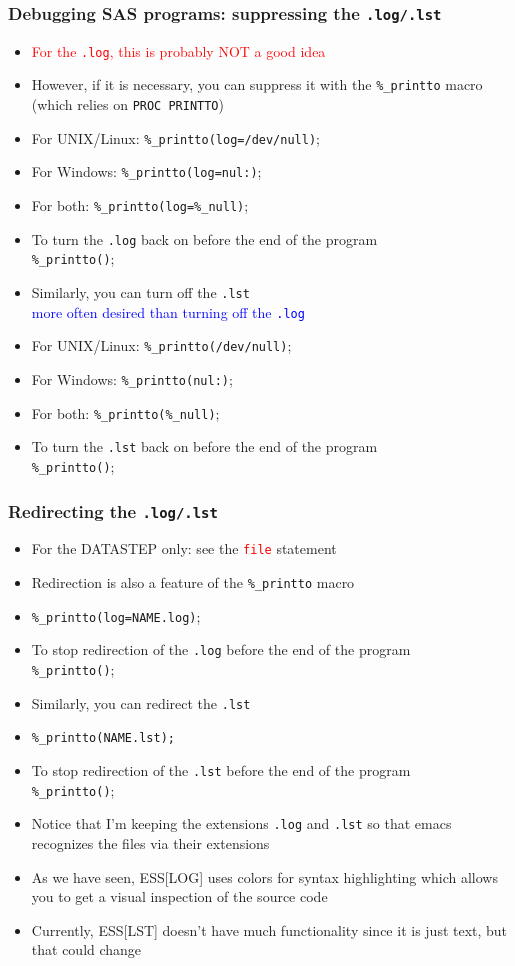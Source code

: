 \documentclass[11pt,pdftex,dvipsnames,usenames,helvetica]{beamer}
\begin{document}
\begin{frame}[fragile]
\frametitle{Debugging SAS programs: suppressing the {\tt .log/.lst}}
\begin{itemize}
\item \textcolor{red}{For the {\tt .log}, this is probably NOT a good idea}
\item However, if it is necessary, you can suppress it with the
{\tt \%\_printto} macro (which relies on {\tt PROC PRINTTO})
\item For UNIX/Linux: {\tt \%\_printto(log=/dev/null)};
\item For Windows: {\tt \%\_printto(log=nul:)};
\item For both: {\tt \%\_printto(log=\%\_null)};
\item To turn the {\tt .log} back on before the end of the program\\
 {\tt \%\_printto()};
\item Similarly, you can turn off the {\tt .lst}\\
\textcolor{blue}{more often desired than turning off the {\tt .log}}
\item For UNIX/Linux: {\tt \%\_printto(/dev/null)};
\item For Windows: {\tt \%\_printto(nul:)};
\item For both: {\tt \%\_printto(\%\_null)};
\item To turn the {\tt .lst} back on before the end of the program\\
 {\tt \%\_printto()};
\end{itemize}
\end{frame}

\begin{frame}[fragile]
\frametitle{Redirecting the {\tt .log/.lst}}
\begin{itemize}
\item For the DATASTEP only: see the \textcolor{red}{\tt file} statement
\item Redirection is also a feature of the {\tt \%\_printto} macro
\item {\tt \%\_printto(log=NAME.log)};
\item To stop redirection of the {\tt .log} before the end of the program\\
 {\tt \%\_printto()};
\item Similarly, you can redirect the {\tt .lst}
\item {\tt \%\_printto(NAME.lst);}
\item To stop redirection of the {\tt .lst} before the end of the program\\
 {\tt \%\_printto()};
\item Notice that I'm keeping the extensions {\tt .log} and {\tt .lst}
so that emacs recognizes the files via their extensions
\item As we have seen, ESS[LOG] uses colors for syntax highlighting
which allows you to get a visual inspection of the source code
\item Currently, ESS[LST] doesn't have much functionality
since it is just text, but that could change
\end{itemize}
\end{frame}
\end{document}
